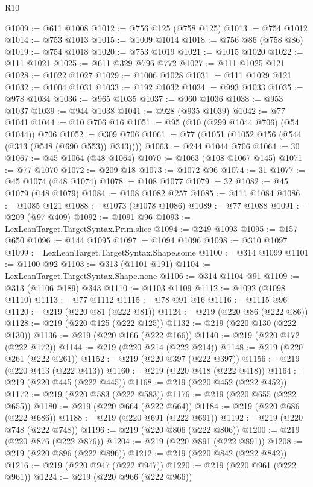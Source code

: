 \begin{lexlean}{R10}
\begin{coremodule}
@1009 := @611 @1008
@1012 := @756 @125 (@758 @125)
@1013 := @754 @1012
@1014 := @753 @1013
@1015 := @1009 @1014
@1018 := @756 @86 (@758 @86)
@1019 := @754 @1018
@1020 := @753 @1019
@1021 := @1015 @1020
@1022 := @111 @1021
@1025 := @611 @329 @796 @772
@1027 := @111 @1025 @121
@1028 := @1022 @1027
@1029 := @1006 @1028
@1031 := @111 @1029 @121
@1032 := @1004 @1031
@1033 := @192 @1032
@1034 := @993 @1033
@1035 := @978 @1034
@1036 := @965 @1035
@1037 := @960 @1036
@1038 := @953 @1037
@1039 := @944 @1038
@1041 := @928 (@935 @1039)
@1042 := @77 @1041
@1044 := @10 @706 @16
@1051 := @95 (@10 (@299 @1044 @706) (@54 @1044)) @706
@1052 := @309 @706
@1061 := @77 (@1051 (@1052 @156 (@544 (@313 (@548 (@690 @553)) @343))))
@1063 := @244 @1044 @706
@1064 := 30
@1067 := @45 @1064 (@48 @1064)
@1070 := @1063 (@108 @1067 @145)
@1071 := @77 @1070
@1072 := @209 @18
@1073 := @1072 @96
@1074 := 31
@1077 := @45 @1074 (@48 @1074)
@1078 := @108 @1077
@1079 := 32
@1082 := @45 @1079 (@48 @1079)
@1084 := @108 @1082 @257
@1085 := @111 @1084
@1086 := @1085 @121
@1088 := @1073 (@1078 @1086)
@1089 := @77 @1088
@1091 := @209 (@97 @409)
@1092 := @1091 @96
@1093 := LexLeanTarget.TargetSyntax.Prim.slice
@1094 := @249 @1093
@1095 := @157 @650
@1096 := @144 @1095
@1097 := @1094 @1096
@1098 := @310 @1097
@1099 := LexLeanTarget.TargetSyntax.Shape.some
@1100 := @314 @1099
@1101 := @1100 @92
@1103 := @313 (@1101 @191)
@1104 := LexLeanTarget.TargetSyntax.Shape.none
@1106 := @314 @1104 @91
@1109 := @313 (@1106 @189) @343
@1110 := @1103 @1109
@1112 := @1092 (@1098 @1110)
@1113 := @77 @1112
@1115 := @78 @91 @16
@1116 := @1115 @96
@1120 := @219 (@220 @81 (@222 @81))
@1124 := @219 (@220 @86 (@222 @86))
@1128 := @219 (@220 @125 (@222 @125))
@1132 := @219 (@220 @130 (@222 @130))
@1136 := @219 (@220 @166 (@222 @166))
@1140 := @219 (@220 @172 (@222 @172))
@1144 := @219 (@220 @214 (@222 @214))
@1148 := @219 (@220 @261 (@222 @261))
@1152 := @219 (@220 @397 (@222 @397))
@1156 := @219 (@220 @413 (@222 @413))
@1160 := @219 (@220 @418 (@222 @418))
@1164 := @219 (@220 @445 (@222 @445))
@1168 := @219 (@220 @452 (@222 @452))
@1172 := @219 (@220 @583 (@222 @583))
@1176 := @219 (@220 @655 (@222 @655))
@1180 := @219 (@220 @664 (@222 @664))
@1184 := @219 (@220 @686 (@222 @686))
@1188 := @219 (@220 @691 (@222 @691))
@1192 := @219 (@220 @748 (@222 @748))
@1196 := @219 (@220 @806 (@222 @806))
@1200 := @219 (@220 @876 (@222 @876))
@1204 := @219 (@220 @891 (@222 @891))
@1208 := @219 (@220 @896 (@222 @896))
@1212 := @219 (@220 @842 (@222 @842))
@1216 := @219 (@220 @947 (@222 @947))
@1220 := @219 (@220 @961 (@222 @961))
@1224 := @219 (@220 @966 (@222 @966))

\end{coremodule}
\end{lexlean}
